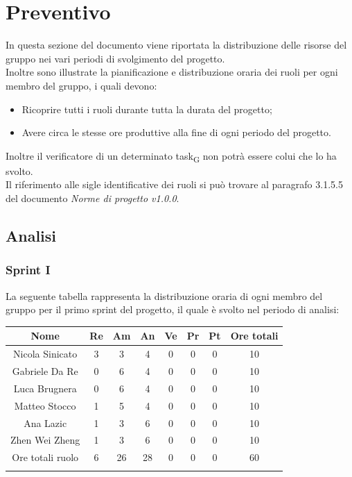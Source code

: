 \section{Preventivo}
In questa sezione del documento viene riportata la distribuzione delle risorse del gruppo nei vari periodi di svolgimento del progetto.\\
Inoltre sono illustrate la pianificazione e distribuzione oraria dei ruoli per ogni membro del gruppo, i quali devono:
\begin{itemize}
	\item Ricoprire tutti i ruoli durante tutta la durata del progetto;
	\item Avere circa le stesse ore produttive alla fine di ogni periodo del progetto.
\end{itemize}
Inoltre il verificatore di un determinato task\textsubscript{G} non potrà essere colui che lo ha svolto.\\
Il riferimento alle sigle identificative dei ruoli si può trovare al paragrafo 3.1.5.5 del documento \textit{Norme di progetto v1.0.0}.
\newpage
\subsection{Analisi}
%
\subsubsection{Sprint I}
%
La seguente tabella rappresenta la distribuzione oraria di ogni membro del gruppo per il primo sprint del progetto, il quale è svolto nel periodo di analisi:

	\setlength\extrarowheight{5pt}
	\begin{tabularx}{\textwidth}{|ccccccc|c|}
		\hline
		\rowcolor{white}
		\textbf{Nome} & \textbf{Re} & \textbf{Am} & \textbf{An} & \textbf{Ve} & \textbf{Pr}& \textbf{Pt} & \textbf{Ore totali} \\
		\hline
		Nicola Sinicato &3&3&4&0&0&0&10 \\
		Gabriele Da Re &0&6&4&0&0&0&10 \\
		Luca Brugnera &0&6&4&0&0&0&10 \\
		Matteo Stocco &1&5&4&0&0&0&10 \\
		Ana Lazic &1&3&6&0&0&0&10 \\
		Zhen Wei Zheng &1&3&6&0&0&0&10 \\
		\hline
		Ore totali ruolo &6&26&28&0&0&0&60 \\
		\hline
		\rowcolor{white}
		\caption{Distribuzione oraria durante il primo sprint per ruolo e persona}
	\end{tabularx}
	\vspace{10pt}
	

